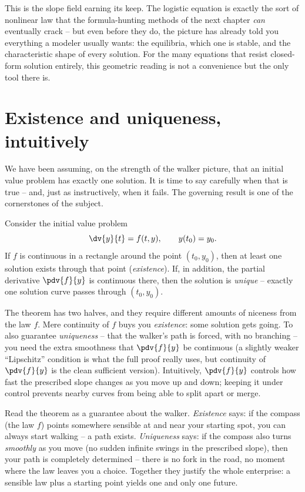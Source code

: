 This is the slope field earning its keep. The logistic equation is exactly the sort of nonlinear law that the formula-hunting methods of the next chapter \emph{can} eventually crack -- but even before they do, the picture has already told you everything a modeler usually wants: the equilibria, which one is stable, and the characteristic shape of every solution. For the many equations that resist closed-form solution entirely, this geometric reading is not a convenience but the only tool there is.

\section{Existence and uniqueness, intuitively}
\label{ch36:sec-exist}

We have been assuming, on the strength of the walker picture, that an initial value problem has exactly one solution. It is time to say carefully when that is true -- and, just as instructively, when it fails. The governing result is one of the cornerstones of the subject.

\begin{theorem}
\label{ch36:thm-exist}
Consider the initial value problem
\[
  \dv{y}{t} = f(t,y), \qquad y(t_0) = y_0.
\]
If $f$ is continuous in a rectangle around the point $(t_0, y_0)$, then at least one solution exists through that point (\emph{existence}). If, in addition, the partial derivative $\pdv{f}{y}$ is continuous there, then the solution is \emph{unique} -- exactly one solution curve passes through $(t_0,y_0)$.
\end{theorem}

The theorem has two halves, and they require different amounts of niceness from the law $f$. Mere continuity of $f$ buys you \emph{existence}: some solution gets going. To also guarantee \emph{uniqueness} -- that the walker's path is forced, with no branching -- you need the extra smoothness that $\pdv{f}{y}$ be continuous (a slightly weaker ``Lipschitz'' condition is what the full proof really uses, but continuity of $\pdv{f}{y}$ is the clean sufficient version). Intuitively, $\pdv{f}{y}$ controls how fast the prescribed slope changes as you move up and down; keeping it under control prevents nearby curves from being able to split apart or merge.

\begin{intuitionbox}
Read the theorem as a guarantee about the walker. \emph{Existence} says: if the compass (the law $f$) points somewhere sensible at and near your starting spot, you can always start walking -- a path exists. \emph{Uniqueness} says: if the compass also turns \emph{smoothly} as you move (no sudden infinite swings in the prescribed slope), then your path is completely determined -- there is no fork in the road, no moment where the law leaves you a choice. Together they justify the whole enterprise: a sensible law plus a starting point yields one and only one future.
\end{intuitionbox}

